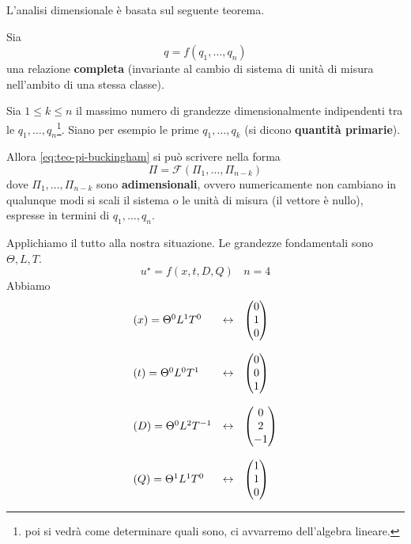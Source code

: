 \documentclass[10pt,a4paper,twoside,openright]{book}
\begin{document}
L'analisi dimensionale è basata sul seguente teorema.
\begin{theorem}
    [Pi di Buckingham] Sia
    \begin{equation}
        q=f(q_{1},\dotsc,q_{n}) \tag{R}
        \label{eq:teo-pi-buckingham}
    \end{equation}
    una relazione \textbf{completa} (invariante al cambio di sistema di unità di misura nell'ambito di una stessa classe).

    Sia $1\leqslant k\leqslant n$ il massimo numero di grandezze dimensionalmente indipendenti tra le $q_{1},\dotsc,q_{n}$\footnote{poi si vedrà come determinare quali sono, ci avvarremo dell'algebra lineare.}. Siano per esempio le prime $q_{1},\dotsc,q_{k}$ (si dicono \textbf{quantità primarie}).

    Allora \eqref{eq:teo-pi-buckingham} si può scrivere nella forma
    \begin{equation*}
        \Pi =\mathcal{F}(\Pi _{1},\dotsc,\Pi _{n-k})
    \end{equation*}
    dove $\Pi _{1},\dotsc,\Pi _{n-k}$ sono \textbf{adimensionali}, ovvero numericamente non cambiano in qualunque modi si scali il sistema o le unità di misura (il vettore è nullo), espresse in termini di $q_{1},\dotsc,q_{n}$.
\end{theorem}
Applichiamo il tutto alla nostra situazione. Le grandezze fondamentali sono $\Theta,L,T$.
\begin{equation*}
    u^{\star } =f(x,t,D,Q) \ \ \ \ n=4
\end{equation*}
Abbiamo
\begin{equation*}
    \begin{array}{ l l }
        (x) =\Theta ^{0} L^{1} T^{0}  & \leftrightarrow \ \ \begin{pmatrix}
            0 \\
            1 \\
            0
        \end{pmatrix} \\\\
        (t) =\Theta ^{0} L^{0} T^{1}  & \leftrightarrow \ \ \begin{pmatrix}
            0 \\
            0 \\
            1
        \end{pmatrix} \\\\
        (D) =\Theta ^{0} L^{2} T^{-1} & \leftrightarrow \ \ \begin{pmatrix}
            0 \\
            2 \\
            -1
        \end{pmatrix} \\\\
        (Q) =\Theta ^{1} L^{1} T^{0}  & \leftrightarrow \ \ \begin{pmatrix}
            1 \\
            1 \\
            0
        \end{pmatrix}
    \end{array}
\end{equation*}
\end{document}
